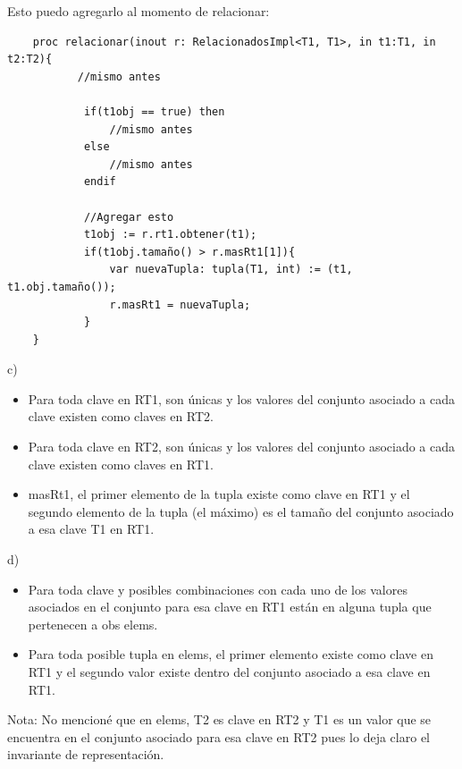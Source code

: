 \documentclass[10pt,a4paper]{article}
\begin{document}
Esto puedo agregarlo al momento de relacionar: 
\begin{lstlisting}
    proc relacionar(inout r: RelacionadosImpl<T1, T1>, in t1:T1, in t2:T2){
           //mismo antes

            if(t1obj == true) then 
                //mismo antes
            else 
                //mismo antes
            endif 

            //Agregar esto
            t1obj := r.rt1.obtener(t1);
            if(t1obj.tamaño() > r.masRt1[1]){
                var nuevaTupla: tupla(T1, int) := (t1, t1.obj.tamaño());
                r.masRt1 = nuevaTupla;
            }
    }
\end{lstlisting}
c) 
\begin{itemize}
    \item Para toda clave en RT1, son únicas y los valores del conjunto asociado a cada clave existen como claves en RT2.
    \item Para toda clave en RT2, son únicas y los valores del conjunto asociado a cada clave existen como claves en RT1.
    \item masRt1, el primer elemento de la tupla existe como clave en RT1 y el segundo elemento de la tupla (el máximo) es el tamaño del conjunto asociado a esa clave T1 en RT1.
\end{itemize}
d) 
\begin{itemize}
    \item Para toda clave y posibles combinaciones con cada uno de los valores asociados en el conjunto para esa clave en RT1 están en alguna tupla que pertenecen a obs elems. 
    \item Para toda posible tupla en elems, el primer elemento existe como clave en RT1 y el segundo valor existe dentro del conjunto asociado a esa clave en RT1.
\end{itemize}
Nota: No mencioné que en elems, T2 es clave en RT2 y T1 es un valor que se encuentra en el conjunto asociado para esa clave en RT2 pues lo deja claro el invariante de representación.
\end{document}
